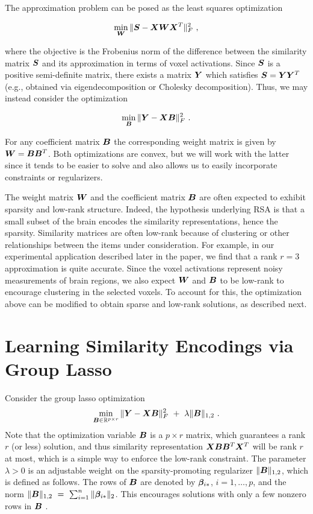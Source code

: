 The approximation problem can be posed as the least squares optimization

$$\min_{\bW} \|\bS-\bX\bW\bX^T\|_F^2 \ , $$

where the objective is the Frobenius norm of the difference between the similarity matrix
$\boldsymbol{S}$ and its approximation in terms of voxel activations. Since $\boldsymbol{S}$ is a positive
semi-definite matrix, there exists a matrix $\boldsymbol{Y}$ which satisfies $\boldsymbol{S}=\boldsymbol{Y}\boldsymbol{Y}^T$ (e.g.,
obtained via eigendecomposition or Cholesky decomposition). Thus, we may instead consider
the optimization

$$\min_{\bB} \|\bY-\bX\bB\|_F^2 \ . $$

For any coefficient matrix $\boldsymbol{B}$ the corresponding weight matrix is given by $\boldsymbol{W} =
\boldsymbol{B}\boldsymbol{B}^T$. Both optimizations are convex, but we will work with the latter since it tends
to be easier to solve and also allows us to easily incorporate constraints or
regularizers.

The weight matrix $\boldsymbol{W}$ and the coefficient matrix $\boldsymbol{B}$ are often expected to exhibit
sparsity and low-rank structure. Indeed, the hypothesis underlying RSA is that a small
subset of the brain encodes the similarity representations, hence the sparsity.
Similarity matrices are often low-rank because of clustering or other relationships
between the items under consideration. For example, in our experimental application
described later in the paper, we find that a rank $r=3$ approximation is quite accurate.
Since the voxel activations represent noisy measurements of brain regions, we also expect
$\boldsymbol{W}$ and $\boldsymbol{B}$ to be low-rank to encourage clustering in the selected voxels. To account
for this, the optimization above can be modified to obtain sparse and low-rank solutions,
as described next.


\section{Learning Similarity Encodings via Group Lasso}

Consider the group lasso optimization
\begin{equation}\label{eqn.grouplasso}
 \min_{\bB\in \R^{p\times r}} \|\bY-\bX\bB\|_F^2 \ + \ \lambda \|\bB\|_{1,2} \ .
 \end{equation}
Note that the optimization variable $\boldsymbol{B}$ is a $p\times r$ matrix, which guarantees a rank
$r$ (or less) solution, and thus similarity representation $\boldsymbol{X}\boldsymbol{B}\boldsymbol{B}^T\boldsymbol{X}^T$ will be rank
$r$ at most, which is a simple way to enforce the low-rank constraint. The parameter
$\lambda>0$ is an adjustable weight on the sparsity-promoting regularizer
$\|\boldsymbol{B}\|_{1,2}$, which is defined as follows. The rows of $\boldsymbol{B}$ are denoted by
$\boldsymbol{\beta}_{i{\ast}}$, $i=1,\dots,p$, and the norm
$\|\boldsymbol{B}\|_{1,2} \ = \ \sum_{i=1}^n \|\boldsymbol{\beta}_{i{\ast}}\|_2$. This encourages solutions with only
a few nonzero rows in $\boldsymbol{B}$ \citep{obo11,lounici,vandegeer}.

